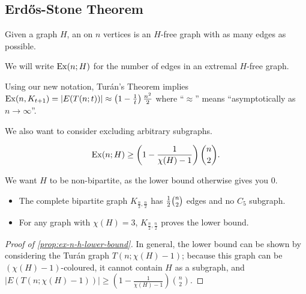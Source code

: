 \documentclass[main.tex]{subfiles}
\begin{document}
\subsection{Erd\H{o}s-Stone Theorem}
\begin{definition*}
  Given a graph $H$, an 
  on $n$ vertices is an $H$-free graph with as many edges as possible.

  We will write $\operatorname{Ex}(n;H)$ for the number of edges in an extremal
  $H$-free graph.
\end{definition*}
Using our new notation, Tur\'an's Theorem implies
$\operatorname{Ex}(n,K_{t+1}) = |E(T(n;t))|\approx\left(1-\frac 1 t\right)\frac{n^2}{2}$
where ``$\approx$'' means ``asymptotically as $n\to\infty$''.

We also want to consider excluding arbitrary subgraphs.
\begin{proposition}\th\label{prop:ex-n-h-lower-bound}
  \leavevmode\vspace{-1em}
  \[
    \operatorname{Ex}(n;H)\geq\left(1 - \frac{1}{\chi(H) - 1}\right)\binom n 2.
  \]
\end{proposition}
We want $H$ to be non-bipartite, as the lower bound otherwise gives you 0.
\begin{example*}
  \listhack
  \begin{itemize}
    \item The complete bipartite graph $K_{\frac n 2,\frac n 2}$ has
      $\frac{1}{2}\binom n 2$ edges and no $C_5$ subgraph.

    \item For any graph with $\chi(H) = 3$, $K_{\frac n 2,\frac n 2}$
      proves the lower bound.
  \end{itemize}
\end{example*}
\begin{proof}[Proof of \th\ref{prop:ex-n-h-lower-bound}]
  In general, the lower bound can be shown by considering the Tur\'an graph
  $T(n;\chi(H)-1)$; because this graph can be $(\chi(H)-1)$-coloured, it cannot
  contain $H$ as a subgraph,
  and $|E(T(n;\chi(H)-1))|\geq\left(1 - \frac{1}{\chi(H)-1}\right)\binom n 2$.
\end{proof}
\end{document}
